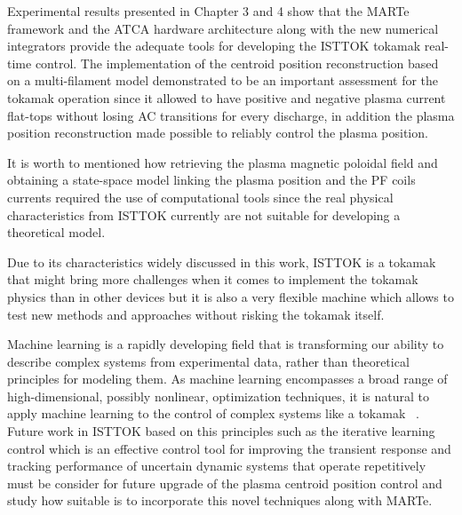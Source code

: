 Experimental results presented in Chapter 3 and 4 show that the MARTe framework and the ATCA hardware architecture along with the new numerical integrators provide the adequate tools for developing the ISTTOK tokamak real-time control. The implementation of the centroid position reconstruction based on a multi-filament model demonstrated to be an important assessment for the tokamak operation since  it allowed to have  positive and negative plasma current flat-tops without losing AC transitions for every discharge, in addition the plasma position reconstruction made  possible to reliably control the plasma position. \smallskip


It is worth to mentioned how retrieving the plasma magnetic poloidal field and obtaining a state-space model linking the plasma position and the PF coils currents required the use of computational tools since the real physical characteristics from ISTTOK currently are not suitable for developing a theoretical model.\smallskip

Due to its characteristics widely discussed in this work, ISTTOK is a tokamak that might bring  more challenges when it comes to implement the tokamak physics than in other devices but it is also a very flexible machine which allows to test new methods and approaches without risking the tokamak itself.\smallskip

Machine learning is a rapidly developing field that is transforming our ability to describe complex systems from experimental data, rather than theoretical principles for modeling them. As machine learning encompasses a broad range of high-dimensional, possibly nonlinear, optimization techniques, it is natural to apply machine learning to the control of complex systems like a tokamak ~\cite[Chapter~10]{DataDriven2019}. Future work in ISTTOK based on this principles such as the iterative learning control which is an effective control tool for improving the transient response and tracking performance of uncertain dynamic systems that operate repetitively~\cite{Ahn2007}  must be consider for future upgrade of the plasma centroid position control and study how suitable is to incorporate this novel techniques along with MARTe.
